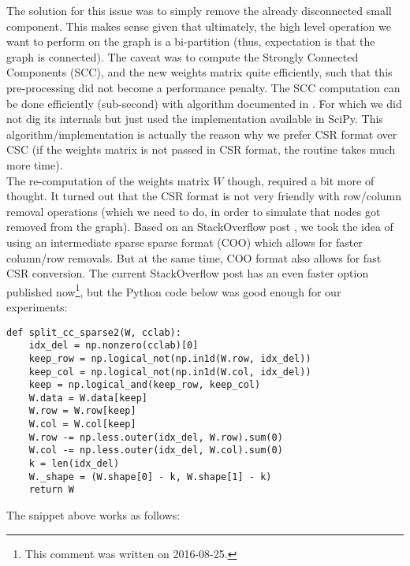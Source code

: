 The solution for this issue was to simply remove the already
disconnected small component. This makes sense given that ultimately,
the high level operation we want to perform on the graph is a
bi-partition (thus, expectation is that the graph is connected). The
caveat was to compute the Strongly Connected Components (\gls{SCC}), and the
new weights matrix quite efficiently, such that this pre-processing
did not become a performance penalty. The \gls{SCC} computation can be done
efficiently (sub-second) with algorithm documented in \cite{pearce05}.
For which we did not dig its internals but just used the
implementation available in SciPy. This  
algorithm/implementation is actually the reason why we prefer CSR
format over CSC (if the weights matrix is not passed in CSR format,
the routine takes much more time). \\

The re-computation of the weights matrix $W$ though, required a bit more
of thought. It turned out that the CSR format is not very friendly
with row/column removal operations (which we need to do, in order to
simulate that nodes got removed from the graph). Based on an
StackOverflow post \cite{alim15}, we took the idea of using an
intermediate sparse sparse format (COO) which allows for faster
column/row removals. But at the same time, COO format also allows for
fast CSR conversion. The current StackOverflow post has an even faster option
published now\footnote{This comment was written on 2016-08-25.}, but the
Python code below was good enough for our experiments: 

\newpage
\begin{lstlisting}
def split_cc_sparse2(W, cclab):
    idx_del = np.nonzero(cclab)[0]
    keep_row = np.logical_not(np.in1d(W.row, idx_del))
    keep_col = np.logical_not(np.in1d(W.col, idx_del))
    keep = np.logical_and(keep_row, keep_col)
    W.data = W.data[keep]
    W.row = W.row[keep]
    W.col = W.col[keep]
    W.row -= np.less.outer(idx_del, W.row).sum(0)
    W.col -= np.less.outer(idx_del, W.col).sum(0)
    k = len(idx_del)
    W._shape = (W.shape[0] - k, W.shape[1] - k)
    return W
    \end{lstlisting}
    \joinbelow{1cm}
    
The snippet above works as follows: \\

